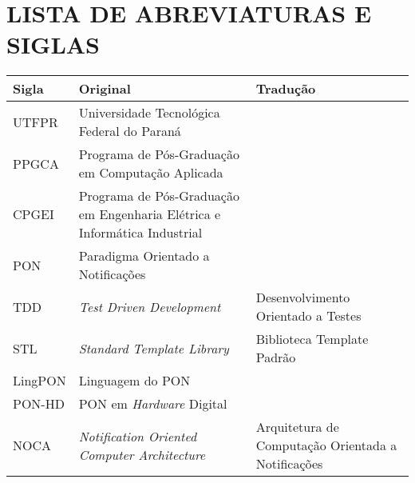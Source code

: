 
\listoffigures*
\cleardoublepage

\listoftables*
\cleardoublepage

\lstlistoflistings
\cleardoublepage

\chapter*{LISTA DE ABREVIATURAS E SIGLAS}

\begin{table}[h!]
\begin{tabularx}{\textwidth}{l|X|X}
Sigla   & Original                                                                  & Tradução                                           \\ \hline
UTFPR   & Universidade Tecnológica Federal do Paraná                                &                                                    \\ \hline
PPGCA   & Programa de Pós-Graduação em Computação Aplicada                          &                                                    \\ \hline
CPGEI   & Programa de Pós-Graduação em Engenharia Elétrica e Informática Industrial &                                                    \\ \hline
PON     & Paradigma Orientado a Notificações                                        &                                                    \\ \hline
TDD     & \textit{Test Driven Development}                                          & Desenvolvimento Orientado a Testes                 \\ \hline
STL     & \textit{Standard Template Library}                                        & Biblioteca Template Padrão                         \\ \hline
LingPON & Linguagem do PON                                                          &                                                    \\ \hline
PON-HD  & PON em \textit{Hardware} Digital                                          &                                                    \\ \hline
NOCA    & \textit{Notification Oriented Computer Architecture}                      & Arquitetura de Computação Orientada a Notificações \\ \hline

\end{tabularx}
\end{table}
